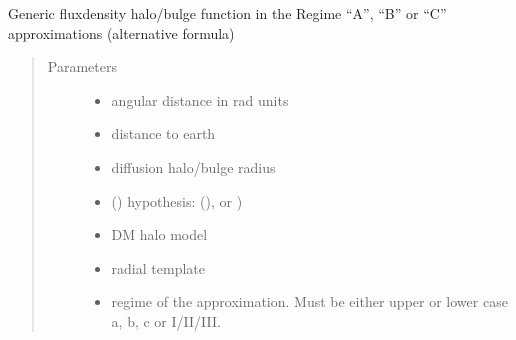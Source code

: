\documentclass[letterpaper,10pt,english]{sphinxmanual}
\begin{document}
\begin{fulllineitems}
\label{\detokenize{diffsph.profiles:diffsph.profiles.hfactors.H_fluxdens_approx}}
\sphinxAtStartPar
Generic flux\sphinxhyphen{}density halo/bulge function in the Regime “A”, “B” or “C” approximations (alternative formula)
\begin{quote}\begin{description}
\item[{Parameters}] \leavevmode\begin{itemize}
\item {} 
\sphinxAtStartPar
{} \textendash{} angular distance in rad units

\item {} 
\sphinxAtStartPar
{} \textendash{} distance to earth

\item {} 
\sphinxAtStartPar
{} \textendash{} diffusion halo/bulge radius

\item {} 
\sphinxAtStartPar
{} () \textendash{} hypothesis:  (),  or )

\item {} 
\sphinxAtStartPar
{} \textendash{} DM halo model

\item {} 
\sphinxAtStartPar
{} \textendash{} radial template

\item {} 
\sphinxAtStartPar
{} \textendash{} regime of the approximation. Must be either upper or lower case a, b, c or I/II/III.

\end{itemize}


\end{description}
\end{quote}
\end{fulllineitems}
\end{document}
